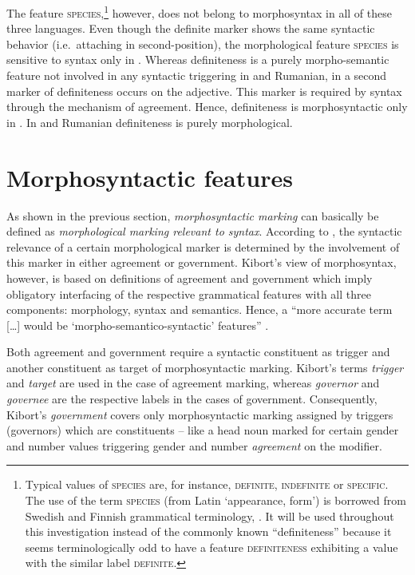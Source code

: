 The feature \textsc{species},\footnote{Typical values of \textsc{species} are, for instance, \textsc{definite, indefinite} or \textsc{specific}. The use of the term \textsc{species} (from Latin ‘appearance, form’) is borrowed from Swedish and Finnish grammatical terminology, \cite[cf., e.g.][]{holm-etal1970,itkonen-t1980a}. It will be used throughout this investigation instead of the commonly known “definiteness” because it seems terminologically odd to have a feature \textsc{definiteness} exhibiting a value with the similar label \textsc{definite}.} however, does not belong to morphosyntax in all of these three languages. Even though the definite marker shows the same syntactic behavior (i.e.~attaching in second-position), the morphological feature \textsc{species} is sensitive to syntax only in . Whereas definiteness is a purely morpho-semantic feature not involved in any syntactic triggering in  and Rumanian, in  a second marker of definiteness occurs on the adjective. This marker is required by syntax through the mechanism of agreement. Hence, definiteness is morphosyntactic only in . In  and Rumanian definiteness is purely morphological.

\section{Morphosyntactic features} \label{crit eval}
As shown in the previous section, \emph{morphosyntactic marking} can basically be defined as \emph{morphological marking relevant to syntax}. According to \cite{kibort2010a}, the syntactic relevance of a certain morphological marker is determined by the involvement of this marker in either agreement or government. Kibort's view of morphosyntax, however, is based on definitions of {agreement} and {government} which imply obligatory interfacing of the respective grammatical features with all three components: morphology, syntax and semantics. Hence, a “more accurate term [\dots] would be ‘morpho-semantico-syntactic’ features” \parencite[??]{kibort2010a}.

Both agreement and government require a syntactic constituent as trigger and another constituent as target of morphosyntactic marking. Kibort's terms \emph{trigger} and \emph{target} are used in the case of agreement marking, whereas \emph{governor} and \emph{governee} are the respective labels in the cases of government. Consequently, Kibort's \emph{government} covers only morphosyntactic marking assigned by triggers (governors) which are constituents – like a head noun marked for certain gender and number values triggering gender and number \emph{agreement} on the modifier.

